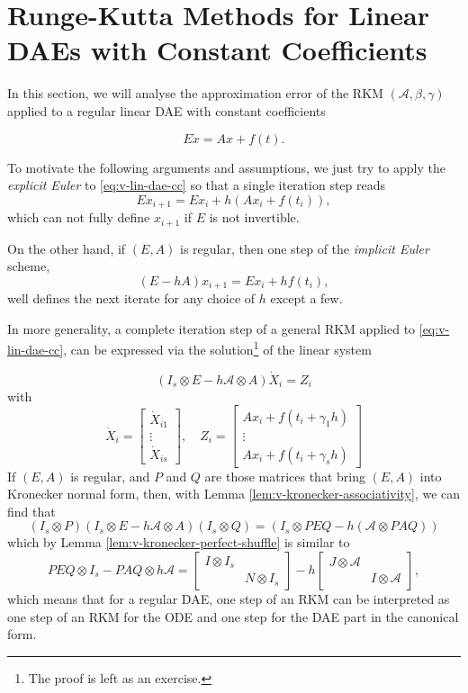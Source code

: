 \documentclass[]{book}
\theoremstyle{definition}
\theoremstyle{definition}
\theoremstyle{definition}
\theoremstyle{definition}
\theoremstyle{remark}
\begin{document}
\hypertarget{runge-kutta-methods-for-linear-daes-with-constant-coefficients}{%
\section{Runge-Kutta Methods for Linear DAEs with Constant Coefficients}\label{runge-kutta-methods-for-linear-daes-with-constant-coefficients}}

In this section, we will analyse the approximation error of the RKM \((\mathcal A, \beta, \gamma)\) applied to a regular linear DAE with constant coefficients

\[
 E\dot x = Ax+f(t). \label{eq:v-lin-dae-cc}
\]

To motivate the following arguments and assumptions, we just try to apply the \emph{explicit Euler} to \eqref{eq:v-lin-dae-cc} so that a single iteration step reads
\[
Ex_{i+1} = Ex_i + h(Ax_i + f(t_i)),
\]
which can not fully define \(x_{i+1}\) if \(E\) is not invertible.

On the other hand, if \((E,A)\) is regular, then one step of the \emph{implicit Euler} scheme,
\[
(E-hA)x_{i+1} = Ex_i + hf(t_i),
\]
well defines the next iterate for any choice of \(h\) except a few.

In more generality, a complete iteration step of a general RKM applied to \eqref{eq:v-lin-dae-cc}, can be expressed via the solution\footnote{The proof is left as an exercise.} of the linear system

\[
(I_s \otimes E - h\mathcal A \otimes A) \dot X_i = Z_i
\]
with
\[
\dot X_i = 
\begin{bmatrix}
\dot X_{i1} \\ \vdots \\ \dot X_{is}
\end{bmatrix}, \quad
Z_i =
\begin{bmatrix}
Ax_{i}+f(t_i+\gamma_1h) \\ \vdots \\ Ax_{i}+f(t_i+\gamma_sh)
\end{bmatrix}
\]
If \((E, A)\) is regular, and \(P\) and \(Q\) are those matrices that bring \((E,A)\) into Kronecker normal form, then, with Lemma \ref{lem:v-kronecker-associativity}, we can find that
\[
(I_s\otimes P)(I_s \otimes E - h\mathcal A \otimes A)(I_s \otimes Q) = (I_s \otimes PEQ - h(\mathcal A \otimes PAQ))
\]
which by Lemma \ref{lem:v-kronecker-perfect-shuffle} is similar to
\[
PEQ\otimes I_s - PAQ \otimes h\mathcal A = 
\begin{bmatrix}
I \otimes I_s & \\ & N\otimes I_s
\end{bmatrix}
- h
\begin{bmatrix}
J \otimes \mathcal A & \\ & I\otimes \mathcal A 
\end{bmatrix},
\]
which means that for a regular DAE, one step of an RKM can be interpreted as one step of an RKM for the ODE and one step for the DAE part in the canonical form.
\end{document}
